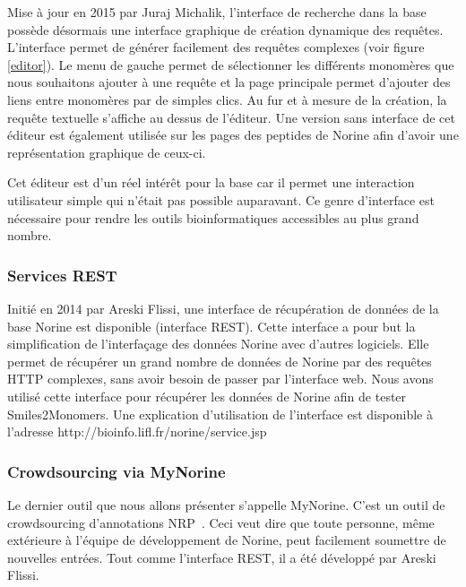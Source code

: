 Mise à jour en 2015 par Juraj Michalik, l'interface de recherche dans la base possède désormais une interface graphique de création dynamique des requêtes.
L'interface permet de générer facilement des requêtes complexes (voir figure \ref{editor}).
Le menu de gauche permet de sélectionner les différents monomères que nous souhaitons ajouter à une requête et la page principale permet d'ajouter des liens entre monomères par de simples clics.
Au fur et à mesure de la création, la requête textuelle s'affiche au dessus de l'éditeur.
Une version sans interface de cet éditeur est également utilisée sur les pages des peptides de Norine afin d'avoir une représentation graphique de ceux-ci.

Cet éditeur est d'un réel intérêt pour la base car il permet une interaction utilisateur simple qui n'était pas possible auparavant.
Ce genre d'interface est nécessaire pour rendre les outils bioinformatiques accessibles au plus grand nombre.



\subsubsection{Services REST}

Initié en 2014 par Areski Flissi, une interface de récupération de données de la base Norine est disponible (interface REST).
Cette interface a pour but la simplification de l’interfaçage des données Norine avec d'autres logiciels.
Elle permet de récupérer un grand nombre de données de Norine par des requêtes HTTP complexes, sans avoir besoin de passer par l'interface web.
Nous avons utilisé cette interface pour récupérer les données de Norine afin de tester Smiles2Monomers.
Une explication d'utilisation de l'interface est disponible à l'adresse http://bioinfo.lifl.fr/norine/service.jsp



\subsubsection{Crowdsourcing via MyNorine}

Le dernier outil que nous allons présenter s'appelle MyNorine.
C'est un outil de crowdsourcing d'annotations NRP~\cite{flissi_norine_2016}.
Ceci veut dire que toute personne, même extérieure à l'équipe de développement de Norine, peut facilement soumettre de nouvelles entrées.
Tout comme l'interface REST, il a été développé par Areski Flissi.

